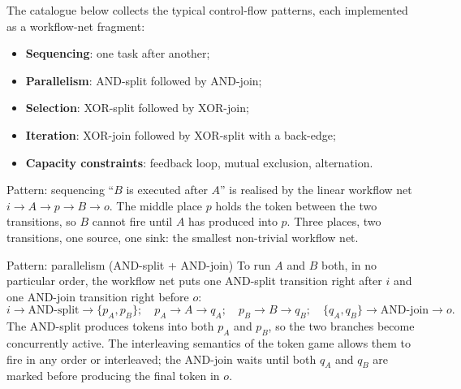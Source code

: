 The catalogue below collects the typical control-flow patterns, each implemented as a workflow-net fragment:

\begin{itemize}
  \item \textbf{Sequencing}: one task after another;
  \item \textbf{Parallelism}: AND-split followed by AND-join;
  \item \textbf{Selection}: XOR-split followed by XOR-join;
  \item \textbf{Iteration}: XOR-join followed by XOR-split with a back-edge;
  \item \textbf{Capacity constraints}: feedback loop, mutual exclusion, alternation.
\end{itemize}

\begin{examplebox}{Pattern: sequencing}
``$B$ is executed after $A$'' is realised by the linear workflow net $i \to A \to p \to B \to o$. The middle place $p$ holds the token between the two transitions, so $B$ cannot fire until $A$ has produced into $p$. Three places, two transitions, one source, one sink: the smallest non-trivial workflow net.

\medskip
\begin{center}
\end{center}
\end{examplebox}

\begin{examplebox}{Pattern: parallelism (AND-split + AND-join)}
To run $A$ and $B$ both, in no particular order, the workflow net puts one AND-split transition right after $i$ and one AND-join transition right before $o$:
\[
  i \to \text{AND-split} \to \{p_A, p_B\}; \quad p_A \to A \to q_A; \quad p_B \to B \to q_B; \quad \{q_A, q_B\} \to \text{AND-join} \to o.
\]
The AND-split produces tokens into both $p_A$ and $p_B$, so the two branches become concurrently active. The interleaving semantics of the token game allows them to fire in any order or interleaved; the AND-join waits until both $q_A$ and $q_B$ are marked before producing the final token in $o$.
\end{examplebox}

